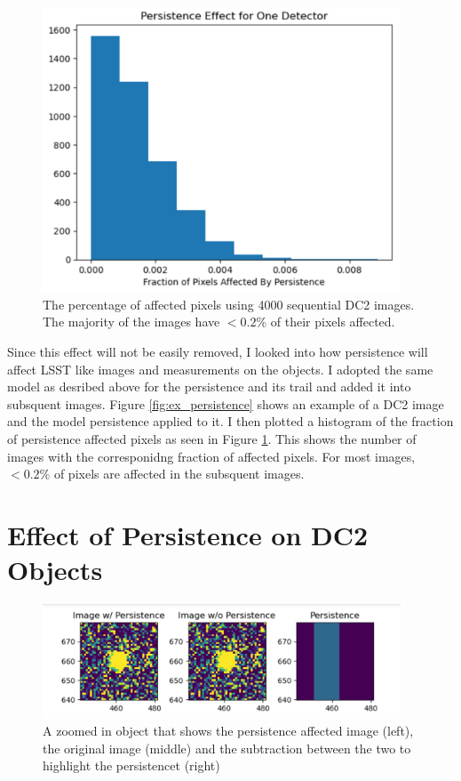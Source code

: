\documentclass[DM,authoryear,toc]{lsstdoc}
\begin{document}
\begin{figure}[!htp]
  \centering
  \includegraphics[width=0.95\textwidth, angle=0]{DC2_percent_affected_pixels.png}
  \caption{
  The percentage of affected pixels using 4000 sequential DC2 images. The majority of the images have $<0.2\%$ of their pixels affected. 
  }
\label{fig:affected_pixels}
\end{figure}


Since this effect will not be easily removed, I looked into how persistence will affect LSST like images and measurements on the objects. 
I adopted the same model as desribed above for the persistence and its trail and added it into subsquent images. 
Figure \ref{fig:ex_persistence} shows an example of a DC2 image and the model persistence applied to it. 
I then plotted a histogram of the fraction of persistence affected pixels as seen in Figure \ref{fig:affected_pixels}. 
This shows the number of images with the corresponidng fraction of affected pixels. 
For most images, $<0.2\%$ of pixels are affected in the subsquent images.


\section {Effect of Persistence on DC2 Objects}

\begin{figure}[!htp]
  \centering
  \includegraphics[width=0.95\textwidth, angle=0]{Obj_pers.png}
  \caption{
  A zoomed in object that shows the persistence affected image (left), the original image (middle) 
  and the subtraction between the two to highlight the persistencet (right)
  }
\label{fig:obj_persistence}
\end{figure}
\end{document}
